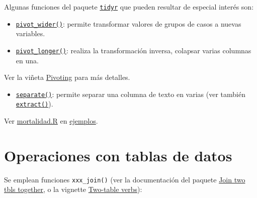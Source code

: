 \documentclass[
]{book}
\providecommand{\tightlist}{%
  \setlength{\itemsep}{0pt}\setlength{\parskip}{0pt}}
\begin{document}
Algunas funciones del paquete \href{https://tidyr.tidyverse.org}{\texttt{tidyr}} que pueden resultar de especial interés son:

\begin{itemize}
\tightlist
\item
  \href{https://tidyr.tidyverse.org/reference/pivot_wider.html}{\texttt{pivot\_wider()}}: permite transformar valores de grupos de casos a nuevas variables.
\item
  \href{https://tidyr.tidyverse.org/reference/pivot_longer.html}{\texttt{pivot\_longer()}}: realiza la transformación inversa, colapsar varias columnas en una.
\end{itemize}

Ver la viñeta \href{https://tidyr.tidyverse.org/articles/pivot.html}{Pivoting} para más detalles.

\begin{itemize}
\tightlist
\item
  \href{https://tidyr.tidyverse.org/reference/separate.html}{\texttt{separate()}}: permite separar una columna de texto en varias (ver también \href{https://tidyr.tidyverse.org/reference/extract.html}{\texttt{extract()}}).
\end{itemize}

Ver \href{ejemplos/mortalidad/mortalidad.R}{mortalidad.R} en \href{https://github.com/rubenfcasal/book_notasr/tree/main/ejemplos}{ejemplos}.

\hypertarget{dplyr-join}{%
\section{Operaciones con tablas de datos}\label{dplyr-join}}

Se emplean funciones \texttt{xxx\_join()} (ver la documentación del paquete
\href{https://dplyr.tidyverse.org/reference/join.html}{Join two tbls together},
o la vignette \href{https://dplyr.tidyverse.org/articles/two-table.html}{Two-table verbs}):
\end{document}
